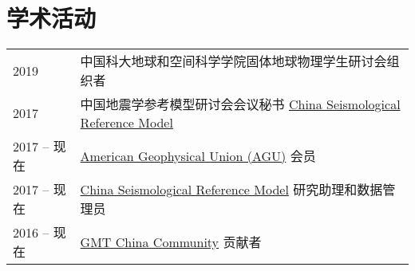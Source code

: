 \section*{学术活动}

\begin{tabular}{ll}
2019    & 中国科大地球和空间科学学院固体地球物理学生研讨会组织者 \\
2017    & 中国地震学参考模型研讨会会议秘书 \href{http://chinageorefmodel.org/}{China Seismological Reference Model} \\ 
2017 -- 现在 & \href{https://sites.agu.org/}{American Geophysical Union (AGU)} 会员 \\
2017 -- 现在 & \href{http://chinageorefmodel.org/}{China Seismological Reference Model} 研究助理和数据管理员\\
2016 -- 现在 & \href{http://gmt-china.org/}{GMT China Community} 贡献者\\
\end{tabular}
